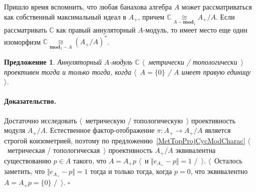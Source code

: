 \documentclass[12pt]{article}
\newcommand{\isom}[1]{\mathop{\mathbin{\cong}}\limits_{#1}}
\newtheorem{proposition}[theorem]{Предложение}
\renewenvironment{proof}{\paragraph{Доказательство.}}{\hfill$\square$\medskip}
\begin{document}
Пришло время вспомнить, что любая банахова алгебра $A$ может рассматриваться как
собственный максимальный идеал в $A_+$, причем
$\mathbb{C}\isom{A-\mathbf{mod}_1} A_+/A$. Если рассматривать $\mathbb{C}$ как
правый аннуляторный $A$-модуль, то имеет место еще один изоморфизм
$\mathbb{C}\isom{\mathbf{mod}_1-A}{(A_+/A)}^*$.

\begin{proposition}\label{MetTopProjModCCharac} Аннуляторный $A$-модуль
    $\mathbb{C}$ $\langle$~метрически / топологически~$\rangle$ проективен тогда
    и только тогда, когда $\langle$~$A= \{0 \}$ / $A$ имеет правую
    единицу~$\rangle$.
\end{proposition}
\begin{proof}
    Достаточно исследовать $\langle$~метрическую / топологическую~$\rangle$
    проективность модуля $A_+/A$. Естественное фактор-отображение $\pi:A_+\to
        A_+/A$ является строгой коизометрией, поэтому по
    предложению~\ref{MetTopProjCycModCharac} $\langle$~метрическая /
    топологическая~$\rangle$ проективность $A_+/A$ эквивалентна существованию
    $p\in A$ такого, что $A=A_+p$ $\langle$~и $\Vert e_{A_+}-p\Vert=1$
    /~$\rangle$. $\langle$~Осталось заметить, что $\Vert e_{A_+}-p\Vert=1$ тогда
    и только тогда, когда $p=0$, что эквивалентно $A=A_+p= \{0 \}$ /~$\rangle$.
\end{proof}
\end{document}
